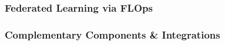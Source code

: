 \subsubsection{Federated Learning via FLOps}

\subsubsection{Complementary Components \& Integrations}